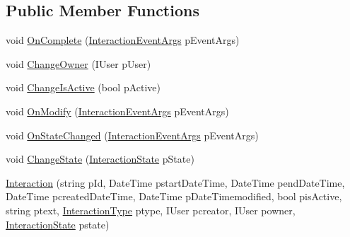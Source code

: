\subsection*{Public Member Functions}
\begin{DoxyCompactItemize}
\item 
void \hyperlink{class_plex_byte_1_1_mo_cap_1_1_interactions_1_1_interaction_a0a837bb8d58f8e2077ba901fadd650a6}{On\+Complete} (\hyperlink{class_plex_byte_1_1_mo_cap_1_1_interactions_1_1_interaction_event_args}{Interaction\+Event\+Args} p\+Event\+Args)
\item 
void \hyperlink{class_plex_byte_1_1_mo_cap_1_1_interactions_1_1_interaction_a4ef64eb1f5bb5e03d1d5ef5cec52f759}{Change\+Owner} (I\+User p\+User)
\item 
void \hyperlink{class_plex_byte_1_1_mo_cap_1_1_interactions_1_1_interaction_ab58345952cc115beaa62f8e556387b87}{Change\+Is\+Active} (bool p\+Active)
\item 
void \hyperlink{class_plex_byte_1_1_mo_cap_1_1_interactions_1_1_interaction_a2f011b1cd2c0e01d8caca6f57c60deec}{On\+Modify} (\hyperlink{class_plex_byte_1_1_mo_cap_1_1_interactions_1_1_interaction_event_args}{Interaction\+Event\+Args} p\+Event\+Args)
\item 
void \hyperlink{class_plex_byte_1_1_mo_cap_1_1_interactions_1_1_interaction_a644354d266913b9a2917989f25d67050}{On\+State\+Changed} (\hyperlink{class_plex_byte_1_1_mo_cap_1_1_interactions_1_1_interaction_event_args}{Interaction\+Event\+Args} p\+Event\+Args)
\item 
void \hyperlink{class_plex_byte_1_1_mo_cap_1_1_interactions_1_1_interaction_a8a50a69a149da786705b71ee33298afb}{Change\+State} (\hyperlink{namespace_plex_byte_1_1_mo_cap_1_1_interactions_afcb673d9186608b6bd3b187179aedc8a}{Interaction\+State} p\+State)
\item 
\hyperlink{class_plex_byte_1_1_mo_cap_1_1_interactions_1_1_interaction_aecbba51e9a9156a9949b7dc4aa626dbc}{Interaction} (string p\+Id, Date\+Time pstart\+Date\+Time, Date\+Time pend\+Date\+Time, Date\+Time pcreated\+Date\+Time, Date\+Time p\+Date\+Timemodified, bool pis\+Active, string ptext, \hyperlink{namespace_plex_byte_1_1_mo_cap_1_1_interactions_a6e7bea333446664bbce2bb296db25e31}{Interaction\+Type} ptype, I\+User pcreator, I\+User powner, \hyperlink{namespace_plex_byte_1_1_mo_cap_1_1_interactions_afcb673d9186608b6bd3b187179aedc8a}{Interaction\+State} pstate)
\end{DoxyCompactItemize}
